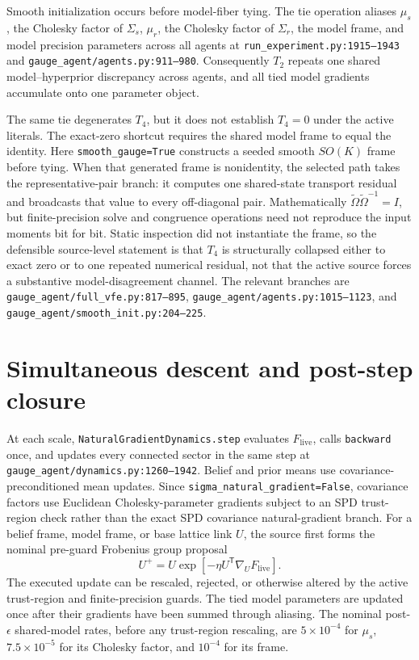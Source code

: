 Smooth initialization occurs before model-fiber tying. The tie operation aliases $\mu_s$, the Cholesky factor of $\Sigma_s$, $\mu_r$, the Cholesky factor of $\Sigma_r$, the model frame, and model precision parameters across all agents at \texttt{run\_experiment.py:1915--1943} and \texttt{gauge\_agent/agents.py:911--980}. Consequently $T_2$ repeats one shared model--hyperprior discrepancy across agents, and all tied model gradients accumulate onto one parameter object.

The same tie degenerates $T_4$, but it does not establish $T_4=0$ under the active literals. The exact-zero shortcut requires the shared model frame to equal the identity. Here \texttt{smooth\_gauge=True} constructs a seeded smooth $SO(K)$ frame before tying. When that generated frame is nonidentity, the selected path takes the representative-pair branch: it computes one shared-state transport residual and broadcasts that value to every off-diagonal pair. Mathematically $\widetilde\Omega\widetilde\Omega^{-1}=I$, but finite-precision solve and congruence operations need not reproduce the input moments bit for bit. Static inspection did not instantiate the frame, so the defensible source-level statement is that $T_4$ is structurally collapsed either to exact zero or to one repeated numerical residual, not that the active source forces a substantive model-disagreement channel. The relevant branches are \texttt{gauge\_agent/full\_vfe.py:817--895}, \texttt{gauge\_agent/agents.py:1015--1123}, and \texttt{gauge\_agent/smooth\_init.py:204--225}.

\section{Simultaneous descent and post-step closure}

At each scale, \texttt{NaturalGradientDynamics.step} evaluates $F_{\mathrm{live}}$, calls \texttt{backward} once, and updates every connected sector in the same step at \texttt{gauge\_agent/dynamics.py:1260--1942}. Belief and prior means use covariance-preconditioned mean updates. Since \texttt{sigma\_natural\_gradient=False}, covariance factors use Euclidean Cholesky-parameter gradients subject to an SPD trust-region check rather than the exact SPD covariance natural-gradient branch. For a belief frame, model frame, or base lattice link $U$, the source first forms the nominal pre-guard Frobenius group proposal
\begin{equation}
 U^{+}=U\exp\left[-\eta U^{\mathsf T}\nabla_UF_{\mathrm{live}}\right].
\end{equation}
The executed update can be rescaled, rejected, or otherwise altered by the active trust-region and finite-precision guards. The tied model parameters are updated once after their gradients have been summed through aliasing. The nominal post-$\epsilon$ shared-model rates, before any trust-region rescaling, are $5\times10^{-4}$ for $\mu_s$, $7.5\times10^{-5}$ for its Cholesky factor, and $10^{-4}$ for its frame.

